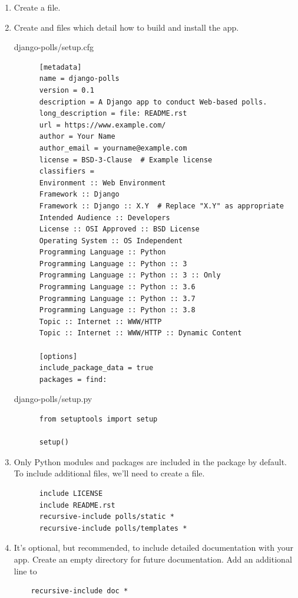 \begin{enumerate}
\item Create a  file.
\item Create  and  files which detail how to build and install the app.
  \begin{tcolorbox}
    django-polls/setup.cfg
    \begin{lstlisting}
      [metadata]
      name = django-polls
      version = 0.1
      description = A Django app to conduct Web-based polls.
      long_description = file: README.rst
      url = https://www.example.com/
      author = Your Name
      author_email = yourname@example.com
      license = BSD-3-Clause  # Example license
      classifiers =
      Environment :: Web Environment
      Framework :: Django
      Framework :: Django :: X.Y  # Replace "X.Y" as appropriate
      Intended Audience :: Developers
      License :: OSI Approved :: BSD License
      Operating System :: OS Independent
      Programming Language :: Python
      Programming Language :: Python :: 3
      Programming Language :: Python :: 3 :: Only
      Programming Language :: Python :: 3.6
      Programming Language :: Python :: 3.7
      Programming Language :: Python :: 3.8
      Topic :: Internet :: WWW/HTTP
      Topic :: Internet :: WWW/HTTP :: Dynamic Content

      [options]
      include_package_data = true
      packages = find:
    \end{lstlisting}
  \end{tcolorbox}

  \begin{tcolorbox}
    django-polls/setup.py
    \begin{lstlisting}
      from setuptools import setup

      setup()
    \end{lstlisting}
  \end{tcolorbox}
\item Only Python modules and packages are included in the package by default. To include additional files, we’ll need to create a  file.
  \begin{tcolorbox}
    \begin{lstlisting}
      include LICENSE
      include README.rst
      recursive-include polls/static *
      recursive-include polls/templates *
    \end{lstlisting}
  \end{tcolorbox}
  
\item It’s optional, but recommended, to include detailed documentation with your app. Create an empty directory  for future documentation. Add an additional line to 
  \begin{lstlisting}
    recursive-include doc *
  \end{lstlisting}
  

\end{enumerate}
